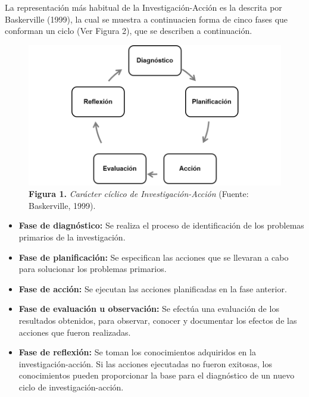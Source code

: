 \documentclass[12pt, a4paper]{article}
\begin{document}
	La representaci\'{o}n m\'{a}s habitual de la Investigaci\'{o}n-Acci\'{o}n es la descrita por Baskerville (1999), la cual se muestra a continuacien forma de cinco fases que conforman un ciclo (Ver Figura 2), que se describen a continuaci\'{o}n.
\FloatBarrier %
\begin{figure}
	\centering
	\includegraphics[scale=0.77]{img/investigacion-accion.png}
		\caption{\textbf{Figura 1.} \textit{Car\'{a}cter c\'{i}clico de Investigaci\'{o}n-Acci\'{o}n} (Fuente: Baskerville, 1999).}
\end{figure}
\FloatBarrier %
\begin{itemize}
	\item \textbf{Fase de diagn\'{o}stico:} Se realiza el proceso de identificaci\'{o}n de los problemas primarios de la investigaci\'{o}n.
	\item \textbf{Fase de planificaci\'{o}n:} Se especifican las acciones que se llevaran a cabo para solucionar los problemas primarios.
	\item \textbf{Fase de acci\'{o}n:} Se ejecutan las acciones planificadas en la fase anterior.
	\item \textbf{Fase de evaluaci\'{o}n u observaci\'{o}n:} Se efect\'{u}a una evaluaci\'{o}n de los resultados obtenidos, para observar, conocer y documentar los efectos de las acciones que fueron realizadas.
	\item \textbf{Fase de reflexi\'{o}n:} Se toman los conocimientos adquiridos en la investigaci\'{o}n-acci\'{o}n. Si las acciones ejecutadas no fueron exitosas, los conocimientos pueden proporcionar la base para el diagn\'{o}stico de un nuevo ciclo de investigaci\'{o}n-acci\'{o}n.
\end{itemize}
\end{document}

